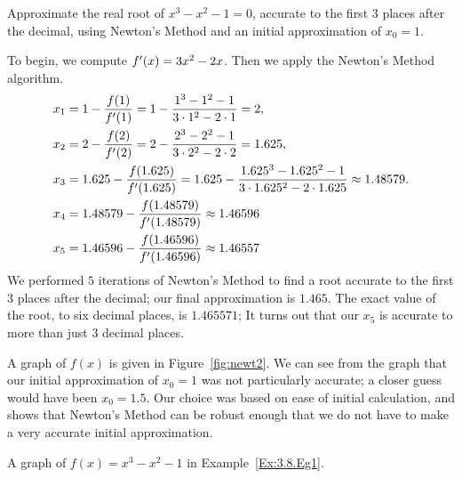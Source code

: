 \begin{example} \label{Ex:3.8.Eg1}
Approximate the real root of $x^3-x^2-1=0$,  accurate to the first $3$ places after the decimal, using Newton's Method and an initial approximation of $x_0=1$.

\solution To begin, we compute $f'(x)=3x^2-2x$.  Then we apply the Newton's Method algorithm. 
\begin{align*}
x_1&=1-\frac{f(1)}{f'(1)}=1-\frac{1^3-1^2-1}{3\cdot 1^2-2\cdot 1}=2,\\
x_2&=2-\frac{f(2)}{f'(2)}=2-\frac{2^3-2^2-1}{3\cdot 2^2-2\cdot 2}=1.625,\\
x_3&=1.625-\frac{f(1.625)}{f'(1.625)} = 1.625-\frac{1.625^3-1.625^2-1}{3\cdot 1.625^2-2\cdot 1.625}\approx 1.48579. \\
x_4 &= 1.48579 - \frac{f(1.48579)}{f'(1.48579)} \approx  1.46596\\
x_5 &= 1.46596 - \frac{f(1.46596)}{f'(1.46596)} \approx 1.46557
\end{align*}
We performed $5$ iterations of Newton's Method to find a root accurate to the first $3$ places after the decimal; our final approximation is $1.465.$ The exact value of the root, to six decimal places, is $1.465571$;  It turns out that our $x_5$ is accurate to more than just $3$ decimal places.

A graph of $f(x)$ is given in Figure~\ref{fig:newt2}. We can see from the graph that our initial approximation of $x_0=1$ was not particularly accurate; a closer guess would have been $x_0=1.5$. Our choice was based on ease of initial calculation, and shows that Newton's Method can be robust enough that we do not have to make a very accurate initial approximation.
\end{example}

\begin{marginfigure}[-6cm]
\caption{A graph of $f(x) = x^3-x^2-1$ in Example~\ref{Ex:3.8.Eg1}.}\label{fig:newt2}
\end{marginfigure}
